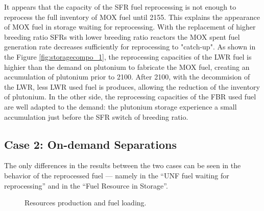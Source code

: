 \documentclass[12pt]{article}
\begin{document}
It appears that the capacity of the SFR fuel reprocessing is not enough to
reprocess the full inventory of MOX fuel until 2155. This explains the
appearance of MOX fuel in storage waiting for reprocessing. With the
replacement of higher breeding ratio SFRs with lower breeding ratio reactors
the MOX spent fuel generation rate decreases sufficiently for reprocessing to
"catch-up".
As shown in the Figure \ref{fig:storagecompo_1}, the reprocessing capacities of
the LWR fuel is highier than the demand on plutonium to fabricate the MOX fuel,
creating an accumulation of plutonium prior to 2100. After 2100, with the
decommision of the LWR, less LWR used fuel is produces, allowing the reduction of
the inventory of plutonium. In the other side, the reprocessing capacities of the
FBR used fuel are well adapted to the demand: the plutonium storage experience a
small accumulation just before the SFR switch of breeding ratio.
 


\subsection{Case 2: On-demand Separations}

The only differences in the results between the two cases can be seen in the
behavior of the reprocessed fuel --- namely in the ``UNF fuel waiting for
reprocessing'' and in the ``Fuel Resource in Storage''.

\begin{figure}[h!]
    \centering
    \caption{Resources production and fuel loading.\label{fig:ARR_FWR_SFC_2} }
\end{figure}
\end{document}
